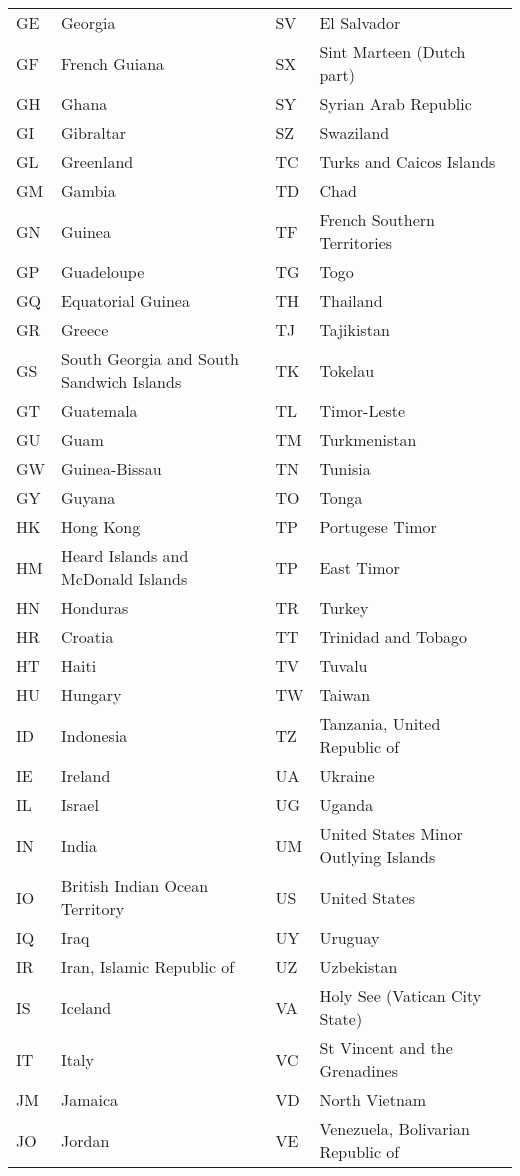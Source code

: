 {\begin{longtable}{lp{5cm}||lp{5cm}}
 GE & Georgia & SV & El Salvador \\
 GF & French Guiana & SX & Sint Marteen (Dutch part) \\
 GH & Ghana & SY & Syrian Arab Republic \\
 GI & Gibraltar & SZ & Swaziland \\
 GL & Greenland & TC & Turks and Caicos Islands \\
 GM & Gambia & TD & Chad \\
 GN & Guinea & TF & French Southern Territories \\
 GP & Guadeloupe & TG & Togo \\
 GQ & Equatorial Guinea & TH & Thailand \\
 GR & Greece & TJ & Tajikistan \\
 GS & South Georgia and South Sandwich Islands & TK & Tokelau \\
 GT & Guatemala & TL & Timor-Leste \\
 GU & Guam & TM & Turkmenistan \\
 GW & Guinea-Bissau & TN & Tunisia \\
 GY & Guyana & TO & Tonga \\
 HK & Hong Kong & TP & Portugese Timor \\
 HM & Heard Islands and McDonald Islands & TP & East Timor \\
 HN & Honduras & TR & Turkey \\
 HR & Croatia & TT & Trinidad and Tobago \\
 HT & Haiti & TV & Tuvalu \\
 HU & Hungary & TW & Taiwan \\
 ID & Indonesia & TZ & Tanzania, United Republic of \\
 IE & Ireland & UA & Ukraine \\
 IL & Israel & UG & Uganda \\
 IN & India & UM & United States Minor Outlying Islands \\
 IO & British Indian Ocean Territory & US & United States \\
 IQ & Iraq & UY & Uruguay \\
 IR & Iran, Islamic Republic of & UZ & Uzbekistan \\
 IS & Iceland & VA & Holy See (Vatican City State) \\
 IT & Italy & VC & St Vincent and the Grenadines \\
 JM & Jamaica & VD & North Vietnam \\
 JO & Jordan & VE & Venezuela, Bolivarian Republic of \\

\end{longtable}}
